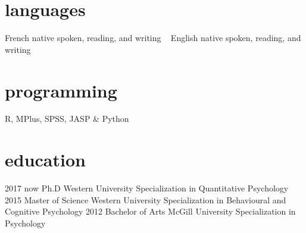 \documentclass[]{k-cv} %
\begin{document}


\begin{aside} %
\section{languages}
French native spoken, reading, and writing
~
English native spoken, reading, and writing
\section{programming}
R, MPlus, SPSS, JASP \& Python
\end{aside}


\section{education}

\begin{entrylist}
\entry
{2017 \to now}
{Ph.D}
{Western University}
{Specialization in Quantitative Psychology}
\entry
{2015 }
{Master {\normalfont of Science}}
{Western University}
{Specialization in Behavioural and Cognitive Psychology}
\entry
{2012 }
{Bachelor {\normalfont of Arts}}
{McGill University}
{Specialization in Psychology}
\end{entrylist}
\end{document}
